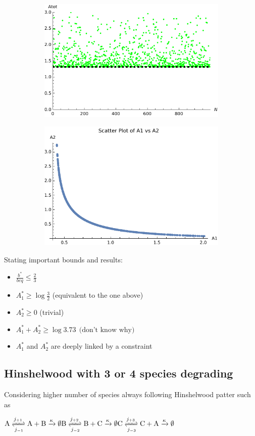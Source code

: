 \documentclass{article}
\begin{document}
	\hfill
	\begin{figure}[h!]
		\begin{subfigure}{\textwidth}
			\includegraphics[width=0.45\linewidth]{plotA1A2.pdf}
		\end{subfigure}
		\begin{subfigure}{\textwidth}
			\includegraphics[width=0.45\linewidth]{Arel.pdf}
		\end{subfigure}
	\end{figure}
	
	
	
	
	
	
	Stating important bounds and results:
	\begin{itemize}
		\item $\frac{b^*}{beq} \le \frac{2}{3}$
		\item $A_1^* \ge \log \frac{3}{2}$ (equivalent to the one above)
		\item $A_2^* \ge 0$ (trivial)
		\item $A_1^*+A_2^* \ge \log  3.73  \ \ \text{(don't know why)}$
		\item $A_1^*$ and $A_2^*$ are deeply linked by a constraint
		
		
	\end{itemize}
	
	\subsection{Hinshelwood with 3 or 4 species degrading}
	
	Considering higher number of species always following Hinshelwood patter such as
	
	\begin{center}
		$\mathrm{A} \xrightleftharpoons[j_{-1}]{j_{+1}}\mathrm{A+B}\xrightarrow{\kappa}\emptyset\\
		\mathrm{B} \xrightleftharpoons[j_{-2}]{j_{+2}}\mathrm{B+C}\xrightarrow{\kappa}\emptyset\\
		\mathrm{C} \xrightleftharpoons[j_{-3}]{j_{+3}}\mathrm{C+A}\xrightarrow{\kappa}\emptyset\\
		$
	\end{center}
	
\end{document}
